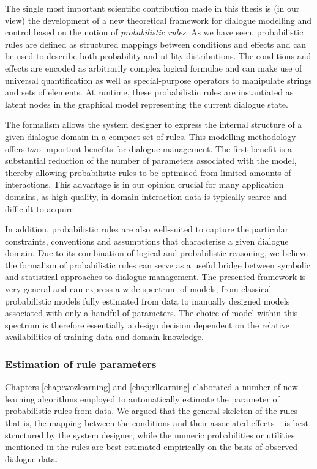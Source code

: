 The single most important scientific contribution made in this thesis is (in our view) the development of a new theoretical framework for dialogue modelling and control based on the notion of \textit{probabilistic rules}.  As we have seen, probabilistic rules are defined as structured mappings between conditions and effects and can be used to describe both probability and utility distributions.  The conditions and effects are encoded as arbitrarily complex logical formulae and can make use of universal quantification as well as special-purpose operators to manipulate strings and sets of elements. At runtime, these probabilistic rules are instantiated as latent nodes in the graphical model representing the current dialogue state.  

The formalism allows the system designer to express the internal structure of a given dialogue domain in a compact set of rules. This modelling methodology offers two important benefits for dialogue management.  The first benefit is a substantial reduction of the number of parameters associated with the model, thereby allowing probabilistic rules to be optimised from limited amounts of interactions. This advantage is in our opinion crucial for many application domains, as high-quality, in-domain interaction data is typically scarce and difficult to acquire.

In addition, probabilistic rules are also well-suited to capture the particular constraints, conventions and assumptions that characterise a given dialogue domain.  Due to its combination of logical and probabilistic reasoning, we believe the formalism of probabilistic rules can serve as a useful bridge between symbolic and statistical approaches to dialogue management.  The presented framework is very general and can express a wide spectrum of models, from classical probabilistic models fully estimated from data to manually designed models associated with only a handful of parameters. The choice of model within this spectrum is therefore essentially a design decision dependent on the relative availabilities of training data and domain knowledge.


\subsubsection*{Estimation of rule parameters}
Chapters \ref{chap:wozlearning} and \ref{chap:rllearning} elaborated a number of new learning algorithms employed to automatically estimate the parameter of probabilistic rules from data. We argued that the general skeleton of the rules -- that is, the mapping between the conditions and their associated effects -- is best structured by the system designer, while the numeric probabilities or utilities mentioned in the rules are best estimated empirically on the basis of observed dialogue data. 

